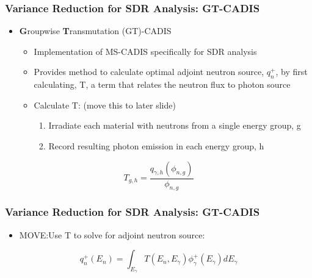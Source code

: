 \documentclass{beamer}
\begin{document}
\begin{frame}
\frametitle{Variance Reduction for SDR Analysis: GT-CADIS}
\begin{itemize}
	\item{\textbf{G}roupwise \textbf{T}ransmutation (GT)-CADIS}
  \begin{itemize}
  \item{Implementation of MS-CADIS specifically for SDR analysis}
  \item{Provides method to calculate optimal adjoint neutron source, $q_n^+$,
	  by first calculating, T, a term that relates the neutron flux to
		  photon source}
	  \item{Calculate T: (move this to later slide)}
	  \begin{enumerate}
		  \item{Irradiate each material with neutrons from a single
			  energy group, g}
		  \item{Record resulting photon emission in each energy group,
			  h}
	  \end{enumerate}
  \end{itemize}

\end{itemize}
\centering
	\begin{equation}
		T_{g,h} = \frac{q_{\gamma,h}(\phi_{n,g})}{\phi_{n,g}}
	\end{equation}

\end{frame}


\begin{frame}
\frametitle{Variance Reduction for SDR Analysis: GT-CADIS}

\begin{itemize}
	\item{MOVE:Use T to solve for adjoint neutron source:}
\end{itemize}
\centering
\begin{equation}
	q_n^+(E_n)=\int_{E_{\gamma}} T(E_n, E_{\gamma}) \phi_{\gamma}^+(E_{\gamma})
	dE_{\gamma}
\end{equation}



\end{frame}
\end{document}
